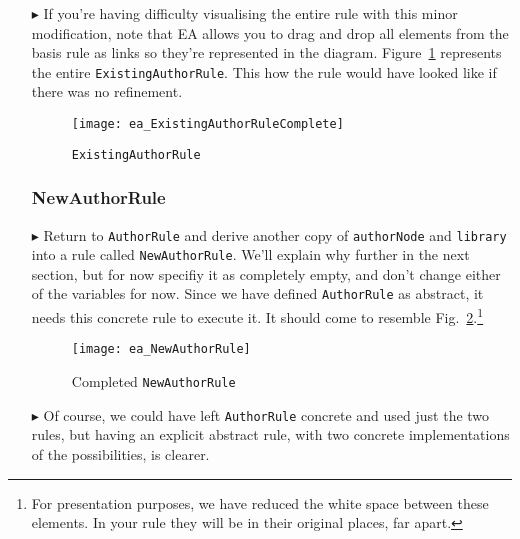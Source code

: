 \begin{itemize}
\item[$\blacktriangleright$] If you're having difficulty visualising the entire rule with this minor modification, note that EA allows you to drag and drop all
elements from the basis rule as links so they're represented in the diagram. Figure~\ref{ea:existingAuthorRuleComplete} represents the entire
\texttt{ExistingAuthorRule}. This how the rule would have looked like if there was no refinement.

\vspace{0.5cm}

\begin{figure}[htbp]
\begin{center}
  \texttt{[image: ea\_ExistingAuthorRuleComplete]}
  \caption{\texttt{ExistingAuthorRule}}
  \label{ea:existingAuthorRuleComplete}
\end{center}
\end{figure}

\vspace{-0.5cm}

\subsubsection{NewAuthorRule} %

\item[$\blacktriangleright$] Return to \texttt{AuthorRule} and derive another copy of \texttt{authorNode} and \texttt{library} into a rule called
\texttt{NewAuthorRule}. We'll explain why further in the next section, but for now specifiy it as completely empty, and don't change either of the variables for
now. Since we have defined \texttt{AuthorRule} as abstract, it needs this concrete rule to execute it. It should come to resemble
Fig.~\ref{ea:NewAuthorRule}.\footnote{For presentation purposes, we have reduced the white space between these elements. In your rule they will be in their
original places, far apart.}

\vspace{0.5cm}

\begin{figure}[htbp]
\begin{center}
  \texttt{[image: ea\_NewAuthorRule]}
  \caption{Completed \texttt{NewAuthorRule}}
  \label{ea:NewAuthorRule}
\end{center}
\end{figure}

\item[$\blacktriangleright$] Of course, we could have left \texttt{AuthorRule} concrete and used just the two rules, but having an explicit abstract rule, with
two concrete implementations of the possibilities, is clearer.


\end{itemize}
